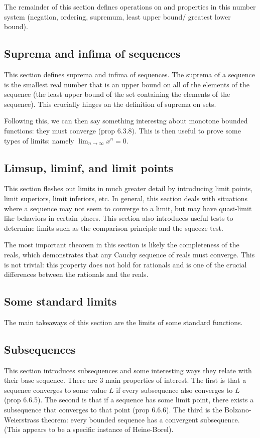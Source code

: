 \documentclass[answers,12pt]{exam}
\begin{document}
The remainder of this section defines operations on and properties in this number system (negation, ordering, supremum, least upper bound/ greatest lower bound).

\subsection{Suprema and infima of sequences}
This section defines suprema and infima of sequences.
The suprema of a sequence is the smallest real number that is an upper bound on all of the elements of the sequence (the least upper bound of the set containing the elements of the sequence).
This crucially hinges on the definition of suprema on sets.

Following this, we can then say something interestng about monotone bounded functions: they must converge (prop 6.3.8).
This is then useful to prove some types of limits: namely $\lim_{n \to \infty}x^n = 0$.

\subsection{Limsup, liminf, and limit points}
This section fleshes out limits in much greater detail by introducing limit points, limit superiors, limit inferiors, etc.
In general, this section deals with situations where a sequence may not seem to converge to a limit, but may have quasi-limit like behaviors in certain places.
This section also introduces useful tests to determine limits such as the comparison principle and the squeeze test.

The most important theorem in this section is likely the completeness of the reals, which demonstrates that any Cauchy sequence of reals must converge.
This is not trivial: this property does not hold for rationals and is one of the crucial differences between the rationals and the reals.

\subsection{Some standard limits}
The main takeaways of this section are the limits of some standard functions.

\subsection{Subsequences}
This section introduces subsequences and some interesting ways they relate with their base sequence.
There are 3 main properties of interest.
The first is that a sequence converges to some value $L$ if every subsequence also converges to $L$ (prop 6.6.5).
The second is that if a sequence has some limit point, there exists a subsequence that converges to that point (prop 6.6.6).
The third is the Bolzano-Weierstrass theorem: every bounded sequence has a convergent subsequence.
(This appears to be a specific instance of Heine-Borel).
\end{document}
